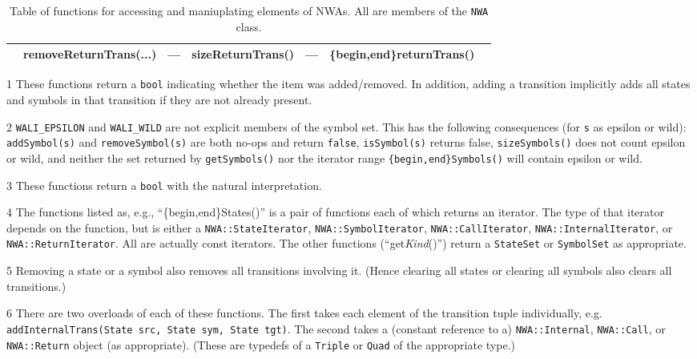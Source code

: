 \begin{sidewaystable}
\begin{threeparttable}
\begin{tabular}{p{0.75in}p{1.55in}p{1.6in}p{1.35in}p{1.27in}p{1.2in}p{1.5in}}
                                                            &  removeReturnTrans(\phantom{.}...\tnote{6}\phantom{a})
                                                                                                        &  ---                       &  sizeReturnTrans()  &  ---                       &  \{begin,end\}returnTrans()\\
\hline
\end{tabular}
\begin{tablenotes}
  \item[1] These functions return a \texttt{bool} indicating whether the item
    was added/removed. In addition, adding a transition implicitly adds all
    states and symbols in that transition if they are not already present.
  \item[2] \texttt{WALI\_EPSILON} and \texttt{WALI\_WILD} are not explicit
    members of the symbol set. This has the following consequences (for
    \texttt{s} as epsilon or wild): \texttt{addSymbol(s)} and
    \texttt{removeSymbol(s)} are both no-ops and return \texttt{false},
    \texttt{isSymbol(s)} returns false, \texttt{sizeSymbols()} does not count
    epsilon or wild, and neither the set returned by \texttt{getSymbols()}
    nor the iterator range \texttt{\{begin,end\}Symbols()} will contain
    epsilon or wild.
  \item[3] These functions return a \texttt{bool} with the natural
    interpretation.
  \item[4] The functions listed as, e.g., ``\{begin,end\}States()'' is a pair
    of functions each of which returns an iterator. The type of that iterator
    depends on the function, but is either a \texttt{NWA::StateIterator},
    \texttt{NWA::SymbolIterator}, \texttt{NWA::CallIterator},
    \texttt{NWA::InternalIterator}, or \texttt{NWA::ReturnIterator}. All are
    actually const iterators. The other functions (``get\textsl{Kind}()'')
    return a \texttt{StateSet} or \texttt{SymbolSet} as appropriate.
  \item[5] Removing a state or a symbol also removes all transitions
    involving it. (Hence clearing all states or clearing all symbols also
    clears all transitions.)
  \item[6] There are two overloads of each of these functions. The first
    takes each element of the transition tuple individually,
    e.g. \texttt{addInternalTrans(State src, State sym, State tgt)}. The
    second takes a (constant reference to a) \texttt{NWA::Internal},
    \texttt{NWA::Call}, or \texttt{NWA::Return} object (as
    appropriate). (These are typedefs of a \texttt{Triple} or \texttt{Quad}
    of the appropriate type.)
\end{tablenotes}
\caption{Table of functions for accessing and maniuplating elements
  of NWAs. All are members of the \texttt{NWA} class. }
\label{Ta:simple-functions}
\end{threeparttable}
\end{sidewaystable}
\restoregeometry

